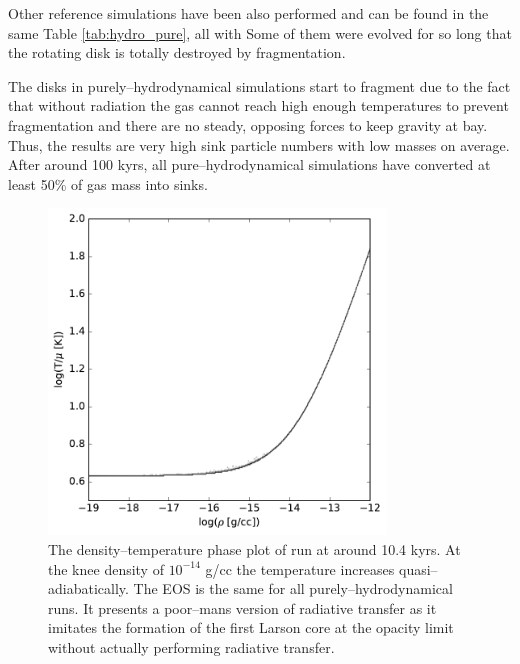 Other reference simulations have been also performed and can be found in the same Table \ref{tab:hydro_pure}, all with 
Some of them were evolved for so long that the rotating disk is totally destroyed by fragmentation.

The disks in purely--hydrodynamical simulations start to fragment due to the fact that without radiation the gas cannot reach high enough temperatures to prevent fragmentation and there are no steady, opposing forces to keep gravity at bay.
Thus, the results are very high sink particle numbers with low masses on average.
After around 100 kyrs, all pure--hydrodynamical simulations have converted at least 50\% of gas mass into sinks.

\begin{figure}[!htb]
 \centering
 \includegraphics[width=0.8\textwidth]{Figures/isotropic_hack}
 \captionsetup{justification=justified,singlelinecheck=false,width=\linewidth}
 \decoRule
 \caption[Polytropic EOS]{The density--temperature phase plot of run  at around 10.4 kyrs.
                          At the knee density of $10^{-14}$ g/cc the temperature increases quasi--adiabatically.
                          The EOS is the same for all purely--hydrodynamical runs.
                          It presents a poor--mans version of radiative transfer as it imitates the formation of the first Larson core at the opacity limit without actually performing radiative transfer.}
\label{fig:isotropic_hack}
\end{figure}
\FloatBarrier

